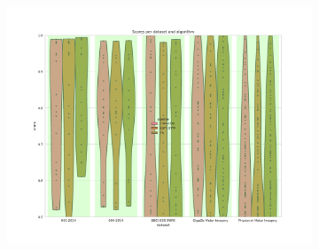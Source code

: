 \begin{figure}
    \centering
    \begin{subfigure}[t]{\textwidth}
        \centering
        \includegraphics[width=\textwidth]{WithinSessionEvaluation_/scores.pdf}
    \end{subfigure}%
     

\end{figure}
